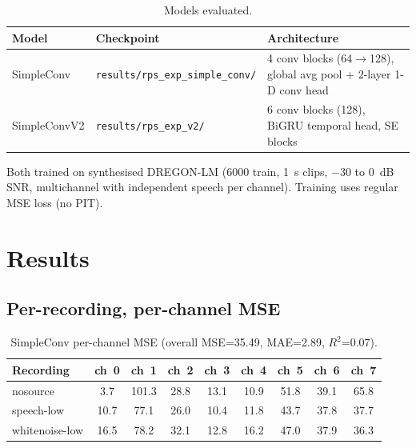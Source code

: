 \documentclass[11pt,a4paper]{article}
\newcommand{\rsq}{\ensuremath{R^{2}}}
\begin{document}
\begin{table}[ht]
  \centering
  \caption{Models evaluated.}
  \label{tab:models}
  \small
  \begin{tabular}{llp{7cm}}
    \toprule
    Model & Checkpoint & Architecture \\
    \midrule
    SimpleConv & \texttt{results/rps\_exp\_simple\_conv/} & 4 conv blocks (64$\to$128), global avg pool + 2-layer 1-D conv head \\
    SimpleConvV2 & \texttt{results/rps\_exp\_v2/} & 6 conv blocks (128), BiGRU temporal head, SE blocks \\
    \bottomrule
  \end{tabular}
\end{table}

Both trained on synthesised DREGON-LM (6000 train, 1~s clips, $-30$ to $0$~dB SNR,
multichannel with independent speech per channel). Training uses regular MSE
loss (no PIT).

\section{Results}

\subsection{Per-recording, per-channel MSE}

\begin{table}[ht]
  \centering
  \caption{SimpleConv per-channel MSE (overall MSE=35.49, MAE=2.89, \rsq=$0.07$).}
  \label{tab:simpleconv}
  \small
  \begin{tabular}{lcccccccc}
    \toprule
    Recording & ch~0 & ch~1 & ch~2 & ch~3 & ch~4 & ch~5 & ch~6 & ch~7 \\
    \midrule
    nosource & 3.7 & 101.3 & 28.8 & 13.1 & 10.9 & 51.8 & 39.1 & 65.8 \\
    speech-low & 10.7 & 77.1 & 26.0 & 10.4 & 11.8 & 43.7 & 37.8 & 37.7 \\
    whitenoise-low & 16.5 & 78.2 & 32.1 & 12.8 & 16.2 & 47.0 & 37.9 & 36.3 \\
    \bottomrule
  \end{tabular}
\end{table}
\end{document}
